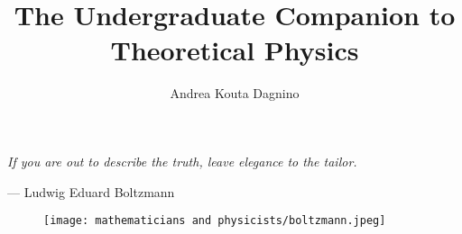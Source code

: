 \documentclass[a4paper,11pt,oneside]{book}
\title{\boldmath \fontsize{35}{45}\selectfont The Undergraduate Companion to Theoretical Physics}
\author[\ddagger]{\Large Andrea Kouta Dagnino}
\affiliation[\ddagger]{Open University, Milton Keynes, UK.}
\begin{document}
 
\maketitle

\newpage

\thispagestyle {empty}

\vspace*{4cm}

\begin{center}
	\Large{\parbox{13cm}{
		\begin{raggedright}
		{\fontsize{20}{48} 
			\textit{If you are out to describe the truth, leave elegance to the tailor.
}
		}
	
		\vspace{.5cm}\hfill{--- Ludwig Eduard Boltzmann}
		\end{raggedright}
	}
}
\vspace{2cm}
\begin{figure}[h!]
    \centering
    \texttt{[image: mathematicians and physicists/boltzmann.jpeg]}
    \label{fig:my_label}
\end{figure}
\end{center}


\onecolumn
\pagestyle{fancy}
\fancyhf{}
\chead{\sffamily{\rightmark}}
\cfoot{$- \  \thepage \ -$}
\end{document}

